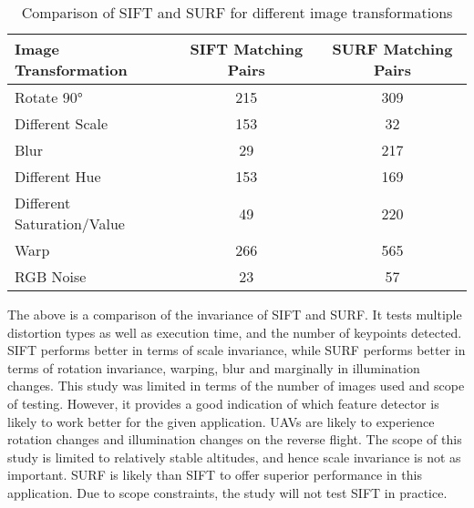 \begin{table}[H]
    \centering
    \caption{Comparison of SIFT and SURF for different image transformations}
    \begin{tabular}{|l|c|c|}
    \hline
    \textbf{Image Transformation} & \textbf{SIFT Matching Pairs} & \textbf{SURF Matching Pairs} \\ \hline
    Rotate 90°                    & 215                          & 309                          \\ \hline
    Different Scale               & 153                          & 32                           \\ \hline
    Blur                          & 29                           & 217                          \\ \hline
    Different Hue                 & 153                          & 169                          \\ \hline
    Different Saturation/Value    & 49                           & 220                          \\ \hline
    Warp                          & 266                          & 565                          \\ \hline
    RGB Noise                     & 23                           & 57                           \\ \hline
    \end{tabular}
    \label{tab:sift_surf_comparison}
    \end{table}
    


The above is a comparison of the invariance of SIFT and SURF. It tests multiple distortion types as well as execution time, and the number of keypoints detected. SIFT performs better in terms of scale invariance, while SURF performs better in terms of rotation invariance, warping, blur and marginally in illumination changes. This study was limited in terms of the number of images used and scope of testing. However, it provides a good indication of which feature detector is likely to work better for the given application. UAVs are likely to experience rotation changes and illumination changes on the reverse flight. The scope of this study is limited to relatively stable altitudes, and hence scale invariance is not as important. SURF is likely than SIFT to offer superior performance in this application. Due to scope constraints, the study will not test SIFT in practice. 







